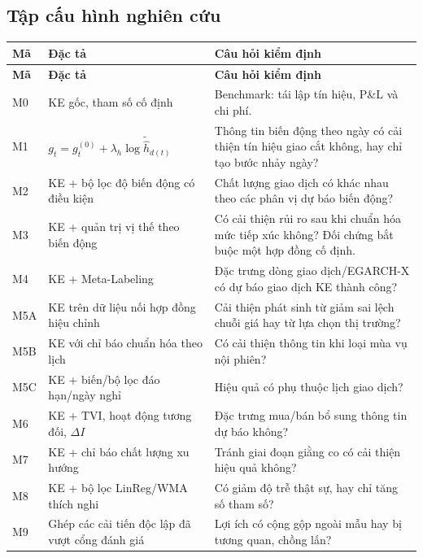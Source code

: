 \documentclass[12pt,a4paper,oneside]{article}
\begin{document}
\subsection{Tập cấu hình nghiên cứu}
\begin{longtable}{p{1.4cm}p{5.4cm}p{7.2cm}}
\toprule
\textbf{Mã} & \textbf{Đặc tả} & \textbf{Câu hỏi kiểm định}\\\midrule\endfirsthead
\toprule\textbf{Mã}&\textbf{Đặc tả}&\textbf{Câu hỏi kiểm định}\\\midrule\endhead
M0& KE gốc, tham số cố định & Benchmark: tái lập tín hiệu, P\&L và chi phí.\\
M1& $g_t=g_t^{(0)}+\lambda_h\widetilde{\log\widehat h_{d(t)}}$ & Thông tin biến động theo ngày có cải thiện tín hiệu giao cắt không, hay chỉ tạo bước nhảy ngày?\\
M2& KE + bộ lọc độ biến động có điều kiện & Chất lượng giao dịch có khác nhau theo các phân vị dự báo biến động?\\
M3& KE + quản trị vị thế theo biến động & Có cải thiện rủi ro sau khi chuẩn hóa mức tiếp xúc không? Đối chứng bắt buộc một hợp đồng cố định.\\
M4& KE + Meta-Labeling & Đặc trưng dòng giao dịch/EGARCH-X có dự báo giao dịch KE thành công?\\
M5A& KE trên dữ liệu nối hợp đồng hiệu chỉnh & Cải thiện phát sinh từ giảm sai lệch chuỗi giá hay từ lựa chọn thị trường?\\
M5B& KE với chỉ báo chuẩn hóa theo lịch & Có cải thiện thông tin khi loại mùa vụ nội phiên?\\
M5C& KE + biến/bộ lọc đáo hạn/ngày nghỉ & Hiệu quả có phụ thuộc lịch giao dịch?\\
M6& KE + TVI, hoạt động tương đối, $\Delta I$ & Đặc trưng mua/bán bổ sung thông tin dự báo không?\\
M7& KE + chỉ báo chất lượng xu hướng & Tránh giai đoạn giằng co có cải thiện hiệu quả không?\\
M8& KE + bộ lọc LinReg/WMA thích nghi & Có giảm độ trễ thật sự, hay chỉ tăng số tham số?\\
M9& Ghép các cải tiến độc lập đã vượt cổng đánh giá & Lợi ích có cộng gộp ngoài mẫu hay bị tương quan, chồng lấn?\\
\bottomrule
\end{longtable}
\end{document}
